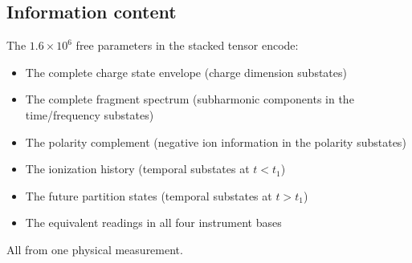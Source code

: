 \documentclass[twocolumn,10pt,a4paper]{article}
\theoremstyle{thmstyle}
\theoremstyle{definition}
\theoremstyle{remark}
\begin{document}
\subsection{Information content}

The $1.6 \times 10^6$ free parameters in the stacked tensor encode:
\begin{itemize}[nosep]
\item The complete charge state envelope (charge dimension substates)
\item The complete fragment spectrum (subharmonic components in the
time/frequency substates)
\item The polarity complement (negative ion information in the polarity
substates)
\item The ionization history (temporal substates at $t < t_1$)
\item The future partition states (temporal substates at $t > t_1$)
\item The equivalent readings in all four instrument bases
\end{itemize}
All from one physical measurement.
\end{document}
